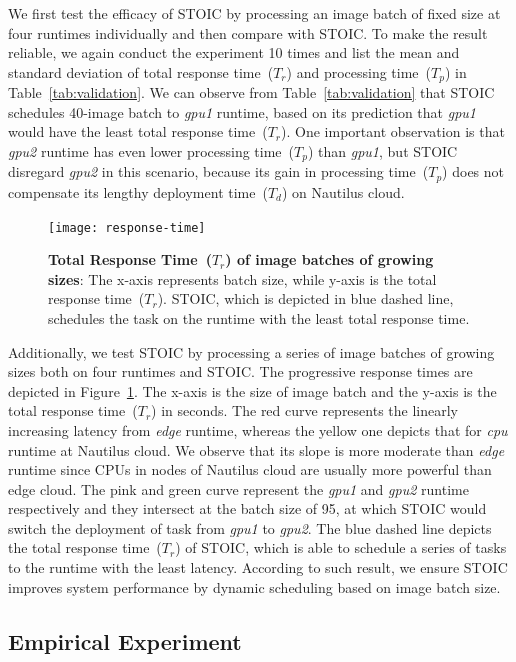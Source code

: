 We first test the efficacy of STOIC by processing an image batch of fixed size at four runtimes individually and then compare with STOIC. To make the result reliable, we again conduct the experiment 10 times and list the mean and standard deviation of total response time~($T_r$) and processing time~($T_p$) in Table~\ref{tab:validation}. We can observe from Table~\ref{tab:validation} that STOIC schedules 40-image batch to \textit{gpu1} runtime, based on its prediction that  \textit{gpu1} would have the least total response time~($T_r$). One important observation is that \textit{gpu2} runtime has even lower processing time~($T_p$) than \textit{gpu1}, but STOIC disregard \textit{gpu2} in this scenario, because its gain in processing time~($T_p$) does not compensate its lengthy deployment time~($T_d$) on Nautilus cloud.

\begin{figure}[t] \centering 
\texttt{[image: response-time]}
\caption{\textbf{Total Response Time~($T_r$) of image batches of growing sizes}: The x-axis represents batch size, while y-axis is the total response time~($T_r$). STOIC, which is depicted in blue dashed line, schedules the task on the runtime with the least total response time.  
\label{fig:response-time}}
\end{figure}

Additionally, we test STOIC by processing a series of image batches of growing sizes both on four runtimes and STOIC. The progressive response times are depicted in Figure~\ref{fig:response-time}. The x-axis is the size of image batch and the y-axis is the total response time~($T_r$) in seconds. The red curve represents the linearly increasing latency from \textit{edge} runtime, whereas the yellow one depicts that for \textit{cpu} runtime at Nautilus cloud. We observe that its slope is more moderate than \textit{edge} runtime since CPUs in nodes of Nautilus cloud are usually more powerful than edge cloud. The pink and green curve represent the \textit{gpu1} and \textit{gpu2} runtime respectively and they intersect at the batch size of 95, at which STOIC would switch the deployment of task from \textit{gpu1} to \textit{gpu2}. The blue dashed line depicts the total response time~($T_r$) of STOIC, which is able to schedule a series of tasks to the runtime with the least latency. According to such result, we ensure STOIC improves system performance by dynamic scheduling based on image batch size.


\subsection{Empirical Experiment}


